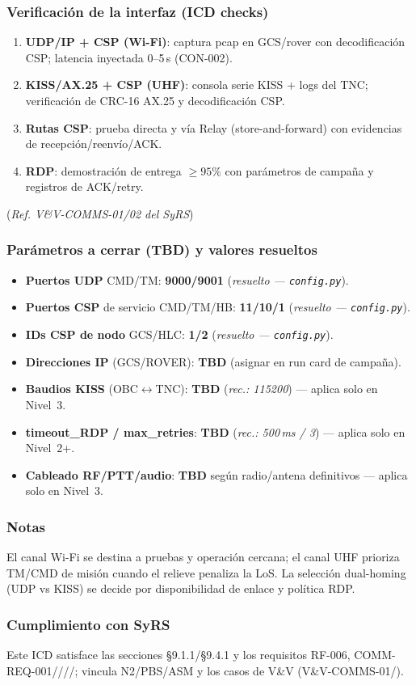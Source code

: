 \subsubsection{Verificación de la interfaz (ICD checks)}
\begin{enumerate}
  \item \textbf{UDP/IP + CSP (Wi-Fi)}: captura pcap en GCS/rover con decodificación CSP; latencia inyectada 0–5\,s (CON-002).
  \item \textbf{KISS/AX.25 + CSP (UHF)}: consola serie KISS + logs del TNC; verificación de CRC-16 AX.25 y decodificación CSP.
  \item \textbf{Rutas CSP}: prueba directa y vía Relay (store-and-forward) con evidencias de recepción/reenvío/ACK.
  \item \textbf{RDP}: demostración de entrega $\geq 95\%$ con parámetros de campaña y registros de ACK/retry.
\end{enumerate}
(\emph{Ref. V\&V-COMMS-01/02 del SyRS})%

\subsubsection{Parámetros a cerrar (TBD) y valores resueltos}
\begin{itemize}
  \item \textbf{Puertos UDP} CMD/TM: \textbf{9000/9001} (\emph{resuelto — \texttt{config.py}}).
  \item \textbf{Puertos CSP} de servicio CMD/TM/HB: \textbf{11/10/1} (\emph{resuelto — \texttt{config.py}}).
  \item \textbf{IDs CSP de nodo} GCS/HLC: \textbf{1/2} (\emph{resuelto — \texttt{config.py}}).
  \item \textbf{Direcciones IP} (GCS/ROVER): \textbf{TBD} (asignar en run card de campaña).
  \item \textbf{Baudios KISS} (OBC$\leftrightarrow$TNC): \textbf{TBD} (\emph{rec.: 115200}) — aplica solo en Nivel~3.
  \item \textbf{timeout\_RDP / max\_retries}: \textbf{TBD} (\emph{rec.: 500\,ms / 3}) — aplica solo en Nivel~2+.
  \item \textbf{Cableado RF/PTT/audio}: \textbf{TBD} según radio/antena definitivos — aplica solo en Nivel~3.
\end{itemize}

\subsubsection{Notas}
El canal Wi-Fi se destina a pruebas y operación cercana; el canal UHF prioriza TM/CMD de misión cuando
el relieve penaliza la LoS. La selección dual-homing (UDP vs KISS) se decide por disponibilidad de enlace
y política RDP.%

\subsubsection{Cumplimiento con SyRS}
Este ICD satisface las secciones §9.1.1/\allowbreak §9.4.1 y los requisitos RF-006, COMM-REQ-001////;
vincula N2/\allowbreak PBS/\allowbreak ASM y los casos de V\&V (V\&V-COMMS-01/).%
